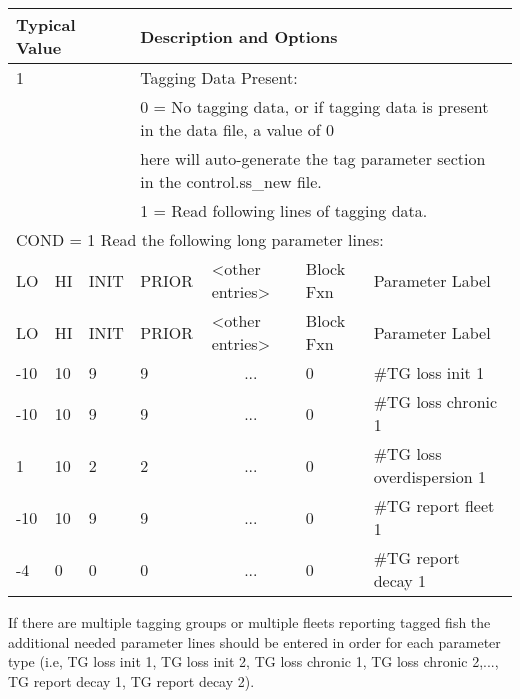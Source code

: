 \begin{longtable}{p{1cm} p{1cm} p{1cm}  p{1.5cm}  p{2.9cm}  p{1.25cm}  p{4.25cm} }
	\hline
	\multicolumn{3}{l}{Typical Value} &  \multicolumn{4}{l}{Description and Options}\Tstrut\Bstrut\\
	\hline
	\multicolumn{3}{l}{1} &  \multicolumn{4}{l}{Tagging Data Present:} \Tstrut\\
	\multicolumn{3}{l}{}  &  \multicolumn{4}{l}{0 = No tagging data, or if tagging data is present in the data file, a value of 0} \\
	\multicolumn{3}{l}{}  &  \multicolumn{4}{l}{ here will auto-generate the tag parameter section in the control.ss\_new file.}\\
	\multicolumn{3}{l}{}  &  \multicolumn{4}{l}{1 = Read following lines of tagging data.} \Bstrut\\


	\multicolumn{7}{l}{COND = 1 Read the following long parameter lines:}\Tstrut\\
	\hline
	LO \Tstrut & HI & INIT & PRIOR &  <other entries> & Block Fxn & Parameter Label\Bstrut\\
	\hline
	\endfirsthead

	\hline
	LO \Tstrut & HI & INIT & PRIOR & <other entries> & Block Fxn & Parameter Label\Bstrut\\
	\hline
	\endhead

	\hline
	\endfoot
	\endlastfoot

	-10 & 10 & 9 & 9 & \multicolumn{1}{c}{...} & 0 & \#TG loss init 1\Tstrut\\
	-10 & 10 & 9 & 9 & \multicolumn{1}{c}{...} & 0 & \#TG loss chronic 1\\
	  1 & 10 & 2 & 2 & \multicolumn{1}{c}{...} & 0 & \#TG loss overdispersion 1\\
	-10 & 10 & 9 & 9 & \multicolumn{1}{c}{...} & 0 & \#TG report fleet 1\\
	 -4 &  0 & 0 & 0 & \multicolumn{1}{c}{...} & 0 & \#TG report decay 1\Bstrut\\
	 \hline
\end{longtable}

If there are multiple tagging groups or multiple fleets reporting tagged fish the additional needed parameter lines should be entered in order for each parameter type (i.e, TG loss init 1, TG loss init 2, TG loss chronic 1, TG loss chronic 2,..., TG report decay 1, TG report decay 2). 

